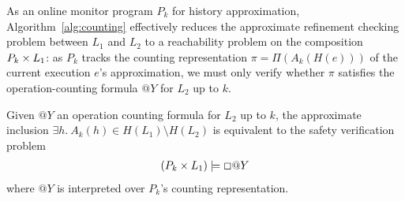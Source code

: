 As an online monitor program $P_k$ for history approximation,
Algorithm~\ref{alg:counting} effectively reduces the approximate refinement
checking problem between $L_1$ and $L_2$ to a reachability problem on the
composition $P_k \times L_1$: as $P_k$ tracks the counting representation $\pi =
\Pi(A_k(H(e)))$ of the current execution $e$'s approximation, we must only
verify whether $\pi$ satisfies the operation-counting formula $@Y$ for $L_2$ up
to $k$.

\begin{corollary}

  Given $@Y$ an operation counting formula for $L_2$ up to $k$, the approximate
  inclusion $\exists h.\ A_k(h) \in H(L_1) \setminus H(L_2)$ is equivalent to
  the safety verification problem
  \begin{align*}
    (P_k \times L_1) |= \Box @Y
  \end{align*}
  where $@Y$ is interpreted over $P_k$'s counting representation.

\end{corollary}
